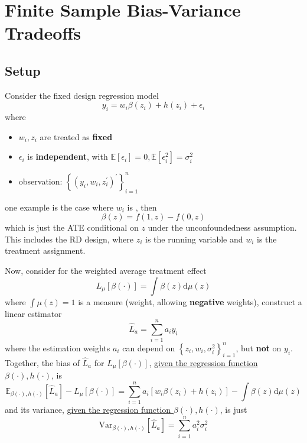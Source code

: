 \documentclass{article}
\begin{document}

\section{Finite Sample Bias-Variance Tradeoffs}
\subsection{Setup}
Consider the fixed design regression model
\begin{equation}
  y_i = w_i\beta\left(z_i\right) + h\left(z_i\right) + \epsilon_i
\end{equation}
where
\begin{itemize}
  \item $w_i,z_i$ are treated as \textbf{fixed}
  \item $\epsilon_i$ is {\textbf{independent}}, with $\mathbb{E}\left[\epsilon_i\right]=0,\mathbb{E}\left[\epsilon^2_i\right]=\sigma^2_i$
  \item observation: $\left\{ \left(y_i,w_i,z_i^{\prime}\right)^{\prime} \right\}^n_{i=1}$
\end{itemize}
one example is the case where $w_i$ is , then 
$$
\beta(z) = f(1,z)-f(0,z)
$$
which is just the ATE conditional on $z$ under the unconfoundedness assumption. This includes the RD design, where $z_i$ is the running variable and $w_i$ is the treatment assignment.

Now, consider for the weighted average treatment effect
$$
L_{\mu}\left[\beta(\cdot)\right] = \int \beta(z)\mathrm{d}\mu(z)
$$
where $\int\mu(z)=1$ is a  measure (weight, allowing \textbf{negative} weights), construct a linear estimator
$$
\hat{L}_a = \sum^n_{i=1}a_iy_i
$$
where the estimation weights $a_i$ can depend on $\left\{ z_i,w_i,\sigma^2_i \right\}^n_{i=1}$, but \textbf{not} on $y_i$. Together, the bias of $\hat{L}_a$ for $L_{\mu}\left[\beta(\cdot)\right]$, \underline{given the regression function $\beta(\cdot),h(\cdot)$}, is 
$$
\mathbb{E}_{\beta(\cdot),h(\cdot)}\left[\hat{L}_a\right] - L_{\mu}\left[\beta(\cdot)\right] = \sum^n_{i=1}a_i\left[w_i\beta(z_i)+h(z_i)\right] - \int\beta(z)\mathrm{d}\mu(z)
$$
and its variance, \underline{given the regression function $\beta(\cdot),h(\cdot)$}, is just
$$
\mathrm{Var}_{\beta(\cdot),h(\cdot)}\left[\hat{L}_a\right] = \sum^n_{i=1}a_i^2\sigma^2_i
$$
\end{document}
